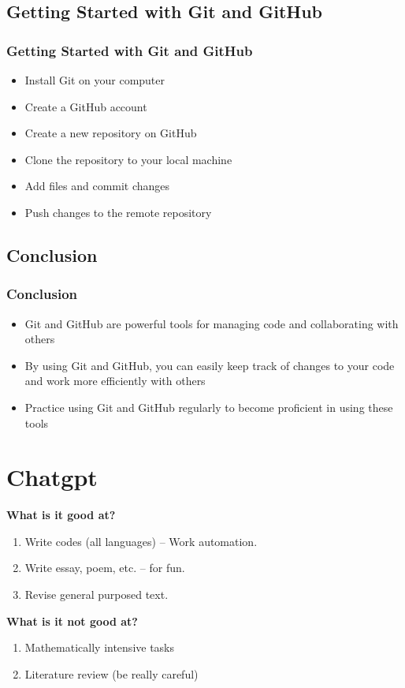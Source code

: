 \documentclass[9pt,table,xcolor=dvipsnames]{beamer}%
\theoremstyle{definition}
\theoremstyle{plain}
\begin{document}
\subsection{Getting Started with Git and GitHub}
\begin{frame}
  \frametitle{Getting Started with Git and GitHub}
  \begin{itemize}
    \item Install Git on your computer
    \item Create a GitHub account
    \item Create a new repository on GitHub
    \item Clone the repository to your local machine
    \item Add files and commit changes
    \item Push changes to the remote repository
  \end{itemize}
\end{frame}
\subsection{Conclusion}
\begin{frame}
  \frametitle{Conclusion}
  \begin{itemize}
    \item Git and GitHub are powerful tools for managing code and collaborating with others
    \item By using Git and GitHub, you can easily keep track of changes to your code and work more efficiently with others
    \item Practice using Git and GitHub regularly to become proficient in using these tools
  \end{itemize}
\end{frame}
\section{Chatgpt}
\begin{frame}[fragile] %

  \textbf{What is it good at?}

   \begin{enumerate}
     \item Write codes (all languages) -- Work automation.
     \item Write essay, poem, etc. -- for fun.
     \item Revise general purposed text.
   \end{enumerate}

  \vfill

  \textbf{What is it not good at?}

   \begin{enumerate}
     \item Mathematically intensive tasks
     \item Literature review (be really careful)
   \end{enumerate}

\end{frame}
\end{document}

